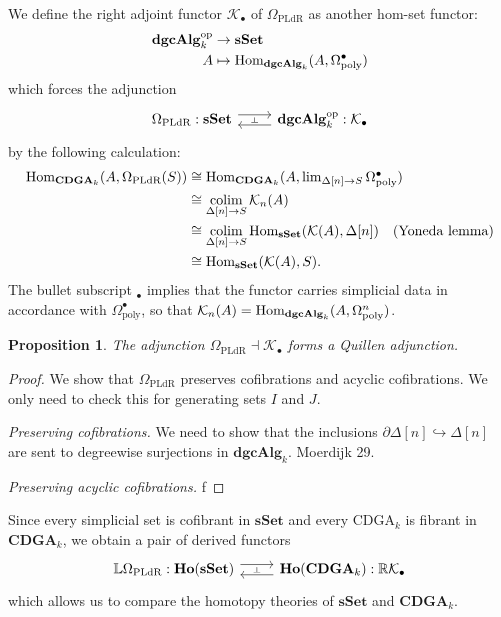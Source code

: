 \documentclass[psamsfonts]{amsart}
\newtheorem{prop}[thm]{Proposition}
\theoremstyle{definition}
\theoremstyle{remark}
\newcommand{\Hom}{\textup{Hom}}
\newcommand{\CDGA}{\mathbf{CDGA}}
\newcommand{\Ho}{\mathbf{Ho}}
\newcommand{\dgcAlg}{\mathbf{dgcAlg}}
\newcommand{\sSet}{\mathbf{sSet}}
\DeclareMathOperator*\colim{colim}
\numberwithin{equation}{section}
\begin{document}
We define the right adjoint functor $\mathcal{K}_\bullet$ of $\Omega_\textrm{PLdR}$ as another hom-set functor:
\begin{align*}
\dgcAlg_k^\textrm{op}&\to\sSet\\
A&\mapsto\Hom_{\dgcAlg_k}(A,\Omega^\bullet_\textrm{poly})
\end{align*}
which forces the adjunction
\[\begin{tikzcd}
	{\Omega_\textrm{PLdR}:\sSet} & {\dgcAlg_k^\textrm{op}:\mathcal{K}_\bullet}
	\arrow[""{name=0, anchor=center, inner sep=0}, shift left=1.5, from=1-1, to=1-2]
	\arrow[""{name=1, anchor=center, inner sep=0}, shift left=1.5, from=1-2, to=1-1]
	\arrow["\dashv"{anchor=center, rotate=-90}, draw=none, from=0, to=1]
\end{tikzcd}\]
by the following calculation:
\begin{align*}
\Hom_{\CDGA_k}(A,\Omega_\textrm{PLdR}(S))&\cong\Hom_{\CDGA_k}(A,\textstyle{\lim_{\Delta[n]\to S}\Omega_\textrm{poly}^\bullet}) \\
&\cong\colim_{\Delta[n]\to S}\mathcal{K}_n(A)\\
&\cong\colim_{\Delta[n]\to S}\Hom_{\sSet}(\mathcal{K}(A),\Delta[n])\quad\textrm{(Yoneda lemma)}\\
&\cong\Hom_{\sSet}(\mathcal{K}(A),S).
\end{align*}
The bullet subscript $_\bullet$ implies that the functor carries simplicial data in accordance with $\Omega^\bullet_\textrm{poly}$, so that $\mathcal{K}_n(A)=\Hom_{\dgcAlg_k}(A,\Omega^n_\textrm{poly})$.

\begin{prop}
The adjunction $\Omega_\mathrm{PLdR}\dashv\mathcal{K}_\bullet$ forms a Quillen adjunction.
\end{prop}
\begin{proof}
We show that $\Omega_\textrm{PLdR}$ preserves cofibrations and acyclic cofibrations. We only need to check this for generating sets $I$ and $J$.\medbreak

\textit{Preserving cofibrations.} We need to show that the inclusions $\partial\Delta[n]\hookrightarrow\Delta[n]$ are sent to degreewise surjections in $\dgcAlg_k$. Moerdijk 29.\medbreak

\textit{Preserving acyclic cofibrations.} f
\end{proof}

Since every simplicial set is cofibrant in $\sSet$ and every CDGA$_k$ is fibrant in $\CDGA_k$, we obtain a pair of derived functors
\[\begin{tikzcd}
	{\mathbb{L}\Omega_\textrm{PLdR}:\Ho(\sSet)} & {\Ho(\CDGA_k):\mathbb{R}\mathcal{K}_\bullet}
	\arrow[""{name=0, anchor=center, inner sep=0}, shift left=1.5, from=1-1, to=1-2]
	\arrow[""{name=1, anchor=center, inner sep=0}, shift left=1.5, from=1-2, to=1-1]
	\arrow["\dashv"{anchor=center, rotate=-90}, draw=none, from=0, to=1]
\end{tikzcd}\]
which allows us to compare the homotopy theories of $\sSet$ and $\CDGA_k$.
\end{document}

